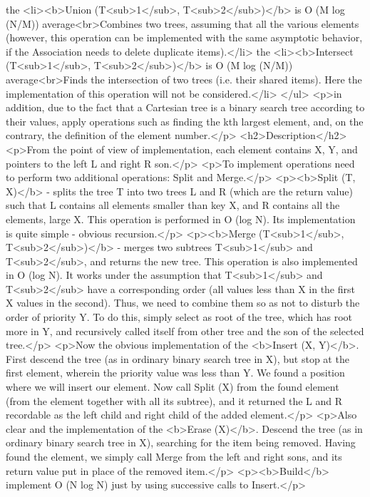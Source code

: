 the <li><b>Union (T<sub>1</sub>, T<sub>2</sub>)</b> is O (M log (N/M)) average<br>Combines two trees, assuming that all the various elements (however, this operation can be implemented with the same asymptotic behavior, if the Association needs to delete duplicate items).</li>
the <li><b>Intersect (T<sub>1</sub>, T<sub>2</sub>)</b> is O (M log (N/M)) average<br>Finds the intersection of two trees (i.e. their shared items). Here the implementation of this operation will not be considered.</li>
</ul>
<p>in addition, due to the fact that a Cartesian tree is a binary search tree according to their values, apply operations such as finding the kth largest element, and, on the contrary, the definition of the element number.</p>
<h2>Description</h2>
<p>From the point of view of implementation, each element contains X, Y, and pointers to the left L and right R son.</p>
<p>To implement operations need to perform two additional operations: Split and Merge.</p>
<p><b>Split (T, X)</b> - splits the tree T into two trees L and R (which are the return value) such that L contains all elements smaller than key X, and R contains all the elements, large X. This operation is performed in O (log N). Its implementation is quite simple - obvious recursion.</p>
<p><b>Merge (T<sub>1</sub>, T<sub>2</sub>)</b> - merges two subtrees T<sub>1</sub> and T<sub>2</sub>, and returns the new tree. This operation is also implemented in O (log N). It works under the assumption that T<sub>1</sub> and T<sub>2</sub> have a corresponding order (all values less than X in the first X values in the second). Thus, we need to combine them so as not to disturb the order of priority Y. To do this, simply select as root of the tree, which has root more in Y, and recursively called itself from other tree and the son of the selected tree.</p>
<p>Now the obvious implementation of the <b>Insert (X, Y)</b>. First descend the tree (as in ordinary binary search tree in X), but stop at the first element, wherein the priority value was less than Y. We found a position where we will insert our element. Now call Split (X) from the found element (from the element together with all its subtree), and it returned the L and R recordable as the left child and right child of the added element.</p>
<p>Also clear and the implementation of the <b>Erase (X)</b>. Descend the tree (as in ordinary binary search tree in X), searching for the item being removed. Having found the element, we simply call Merge from the left and right sons, and its return value put in place of the removed item.</p>
<p><b>Build</b> implement O (N log N) just by using successive calls to Insert.</p>
